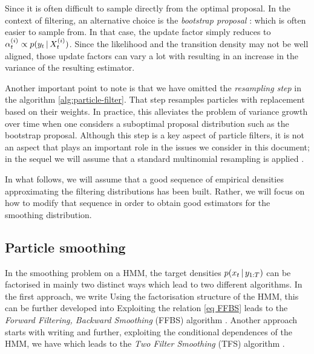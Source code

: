 Since it is often difficult to sample directly from the optimal proposal. In the context of filtering, an alternative choice is the \emph{bootstrap proposal} \citep{doucet11}: 
which is often easier to sample from. In that case, the update factor simply reduces to $\alpha^{(i)}_t \propto p(y_t\,|\, X^{(i)}_t)$. Since the likelihood and the transition density may not be well aligned, those update factors can vary a lot with resulting in an increase in the variance of the resulting estimator.

Another important point to note is that we have omitted the \emph{resampling step} in the algorithm \ref{alg:particle-filter}. That step resamples particles with replacement based on their weights. In practice, this alleviates the problem of variance growth over time when one considers a suboptimal proposal distribution such as the bootstrap proposal. Although this step is a key aspect of particle filters, it is not an aspect that plays an important role in the issues we consider in this document; in the sequel we will assume that a standard multinomial resampling is applied \citep{doucet11}.

 In what follows, we will assume that a good sequence of empirical densities approximating the filtering distributions has been built. Rather, we will focus on how to modify that sequence in order to obtain good estimators for the smoothing distribution.
\subsection{Particle smoothing}
In the smoothing problem on a HMM, the target densities $p(x_t\,|\, y_{1:T})$ can be factorised in mainly two distinct ways which lead to two different algorithms. In the first approach, we write 
 Using the factorisation structure of the HMM, this can be further developed into
Exploiting the relation \eqref{eq FFBS} leads to the \emph{Forward Filtering, Backward Smoothing} (FFBS) algorithm \citep{hurzeler98, doucet00}. Another approach starts with writing 
and further, exploiting the conditional dependences of the HMM, we have
which leads to the \emph{Two Filter Smoothing} (TFS) algorithm \citep{kitagawa96}.

